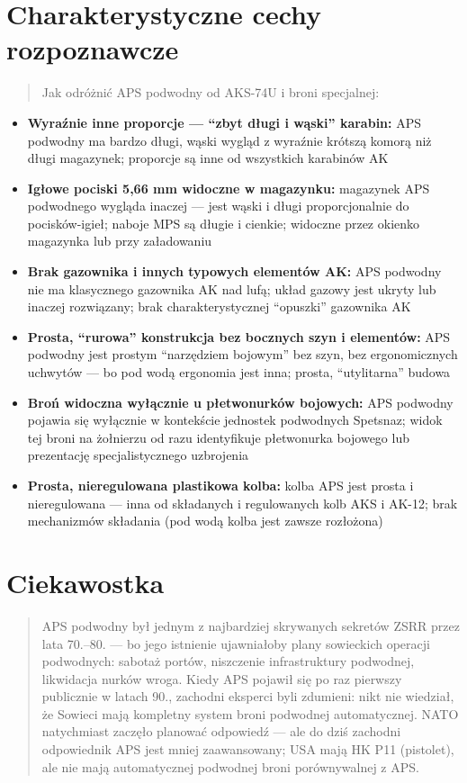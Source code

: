 \documentclass[12pt,openany,oneside]{book}
\providecommand{\tightlist}{%
  \setlength{\itemsep}{0pt}\setlength{\parskip}{0pt}}
\begin{document}
\section{Charakterystyczne cechy
rozpoznawcze}\label{charakterystyczne-cechy-rozpoznawcze-100}

\begin{quote}
Jak odróżnić APS podwodny od AKS-74U i broni specjalnej:
\end{quote}

\begin{itemize}
\tightlist
\item
  \textbf{Wyraźnie inne proporcje --- ``zbyt długi i wąski'' karabin:}
  APS podwodny ma bardzo długi, wąski wygląd z wyraźnie krótszą komorą
  niż długi magazynek; proporcje są inne od wszystkich karabinów AK
\item
  \textbf{Igłowe pociski 5,66 mm widoczne w magazynku:} magazynek APS
  podwodnego wygląda inaczej --- jest wąski i długi proporcjonalnie do
  pocisków-igieł; naboje MPS są długie i cienkie; widoczne przez okienko
  magazynka lub przy załadowaniu
\item
  \textbf{Brak gazownika i innych typowych elementów AK:} APS podwodny
  nie ma klasycznego gazownika AK nad lufą; układ gazowy jest ukryty lub
  inaczej rozwiązany; brak charakterystycznej ``opuszki'' gazownika AK
\item
  \textbf{Prosta, ``rurowa'' konstrukcja bez bocznych szyn i elementów:}
  APS podwodny jest prostym ``narzędziem bojowym'' bez szyn, bez
  ergonomicznych uchwytów --- bo pod wodą ergonomia jest inna; prosta,
  ``utylitarna'' budowa
\item
  \textbf{Broń widoczna wyłącznie u płetwonurków bojowych:} APS podwodny
  pojawia się wyłącznie w kontekście jednostek podwodnych Spetsnaz;
  widok tej broni na żołnierzu od razu identyfikuje płetwonurka bojowego
  lub prezentację specjalistycznego uzbrojenia
\item
  \textbf{Prosta, nieregulowana plastikowa kolba:} kolba APS jest prosta
  i nieregulowana --- inna od składanych i regulowanych kolb AKS i
  AK-12; brak mechanizmów składania (pod wodą kolba jest zawsze
  rozłożona)
\end{itemize}

\section{Ciekawostka}\label{ciekawostka-100}

\begin{quote}
APS podwodny był jednym z najbardziej skrywanych sekretów ZSRR przez
lata 70.--80. --- bo jego istnienie ujawniałoby plany sowieckich
operacji podwodnych: sabotaż portów, niszczenie infrastruktury
podwodnej, likwidacja nurków wroga. Kiedy APS pojawił się po raz
pierwszy publicznie w latach 90., zachodni eksperci byli zdumieni: nikt
nie wiedział, że Sowieci mają kompletny system broni podwodnej
automatycznej. NATO natychmiast zaczęło planować odpowiedź --- ale do
dziś zachodni odpowiednik APS jest mniej zaawansowany; USA mają HK P11
(pistolet), ale nie mają automatycznej podwodnej broni porównywalnej z
APS.
\end{quote}
\end{document}
